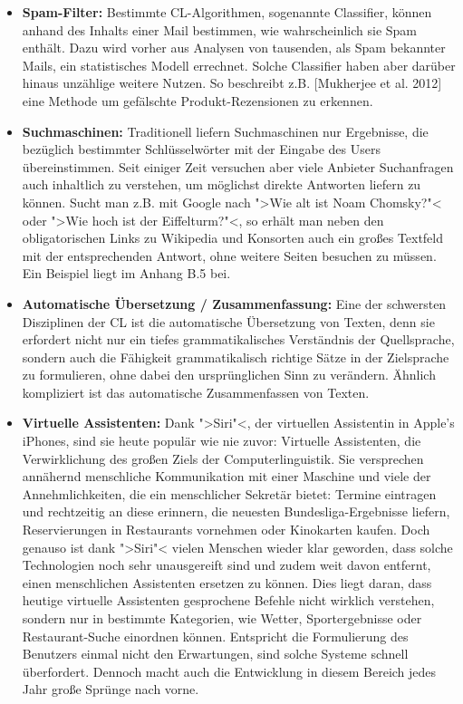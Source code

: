 \documentclass[12pt,a4paper]{article}
\theoremstyle{definition}
\begin{document}
		\begin{itemize}
		\item{
			\textbf{Spam-Filter:}
			Bestimmte CL-Algorithmen, sogenannte Classifier, können anhand des Inhalts einer Mail bestimmen, wie wahrscheinlich sie Spam enthält. Dazu wird vorher aus Analysen von tausenden, als Spam bekannter Mails, ein statistisches Modell errechnet. Solche Classifier haben aber darüber hinaus unzählige weitere Nutzen. So beschreibt z.B. [Mukherjee et al. 2012] eine Methode um gefälschte Produkt-Rezensionen zu erkennen.
			
		}
		\item{
			\textbf{Suchmaschinen:}
			Traditionell liefern Suchmaschinen nur Ergebnisse, die bezüglich bestimmter Schlüsselwörter mit der Eingabe des Users übereinstimmen. Seit einiger Zeit versuchen aber viele Anbieter Suchanfragen auch inhaltlich zu verstehen, um möglichst direkte Antworten liefern zu können. Sucht man z.B. mit Google nach ">Wie alt ist Noam 	Chomsky?"< oder ">Wie hoch ist der Eiffelturm?"<, so erhält man neben den obligatorischen Links zu Wikipedia und Konsorten auch ein großes Textfeld mit der 	entsprechenden Antwort, ohne weitere Seiten besuchen zu müssen. Ein Beispiel liegt im Anhang B.5 bei.
		}
		\item{
			\textbf{Automatische Übersetzung / Zusammenfassung:}
			Eine der schwersten Disziplinen der CL ist die automatische Übersetzung von Texten, denn sie erfordert nicht nur ein tiefes grammatikalisches Verständnis der Quellsprache, sondern auch die Fähigkeit grammatikalisch richtige Sätze in der Zielsprache zu formulieren, ohne dabei den ursprünglichen Sinn zu verändern. Ähnlich kompliziert ist das automatische Zusammenfassen von Texten.
		}
		\item{
			\textbf{Virtuelle Assistenten:}
			Dank ">Siri"<, der virtuellen Assistentin in Apple's iPhones, sind sie heute populär wie nie zuvor: Virtuelle Assistenten, die Verwirklichung des großen Ziels der Computerlinguistik. Sie versprechen annähernd menschliche Kommunikation mit einer Maschine und viele der Annehmlichkeiten, die ein menschlicher Sekretär bietet: Termine eintragen und rechtzeitig an diese erinnern, die neuesten Bundesliga-Ergebnisse liefern, Reservierungen in Restaurants vornehmen oder Kinokarten kaufen. Doch genauso ist dank ">Siri"< vielen Menschen wieder klar geworden, dass solche Technologien noch sehr unausgereift sind und zudem weit davon entfernt, einen menschlichen Assistenten ersetzen zu können. Dies liegt daran, dass heutige virtuelle Assistenten gesprochene Befehle nicht wirklich verstehen, sondern nur in bestimmte Kategorien, wie Wetter, Sportergebnisse oder Restaurant-Suche einordnen können. Entspricht die Formulierung des Benutzers einmal nicht den Erwartungen, sind solche Systeme schnell überfordert. Dennoch macht auch die Entwicklung in diesem Bereich jedes Jahr große Sprünge nach vorne.
		}
		\end{itemize}
		
\end{document}

